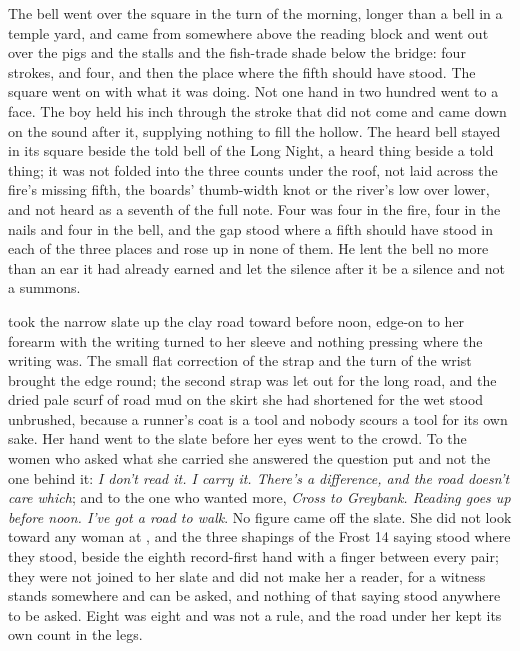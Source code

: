 The bell went over the square in the turn of the morning, longer than a bell in a temple yard, and came from somewhere above the reading block and went out over the pigs and the stalls and the fish-trade shade below the bridge: four strokes, and four, and then the place where the fifth should have stood. The square went on with what it was doing. Not one hand in two hundred went to a face. The boy held his inch through the stroke that did not come and came down on the sound after it, supplying nothing to fill the hollow. The heard bell stayed in its square beside the told bell of the Long Night, a heard thing beside a told thing; it was not folded into the three counts under the roof, not laid across the fire's missing fifth, the boards' thumb-width knot or the river's low over lower, and not heard as a seventh of the full note. Four was four in the fire, four in the nails and four in the bell, and the gap stood where a fifth should have stood in each of the three places and rose up in none of them. He lent the bell no more than an ear it had already earned and let the silence after it be a silence and not a summons.

\scenebreak

 took the narrow slate up the clay road toward  before noon, edge-on to her forearm with the writing turned to her sleeve and nothing pressing where the writing was. The small flat correction of the strap and the turn of the wrist brought the edge round; the second strap was let out for the long road, and the dried pale scurf of road mud on the skirt she had shortened for the wet stood unbrushed, because a runner's coat is a tool and nobody scours a tool for its own sake. Her hand went to the slate before her eyes went to the crowd. To the women who asked what she carried she answered the question put and not the one behind it: \emph{I don't read it. I carry it. There's a difference, and the road doesn't care which}; and to the one who wanted more, \emph{Cross to Greybank. Reading goes up before noon. I've got a road to walk}. No figure came off the slate. She did not look toward any woman at , and the three shapings of the Frost 14 saying stood where they stood, beside the eighth record-first hand with a finger between every pair; they were not joined to her slate and did not make her a reader, for a witness stands somewhere and can be asked, and nothing of that saying stood anywhere to be asked. Eight was eight and was not a rule, and the road under her kept its own count in the legs.

